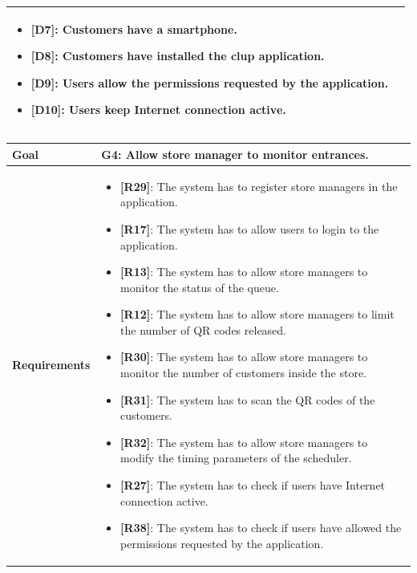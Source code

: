 \begin{table}[H]
\begin{tabular}{| m{} | m{} |}
        \begin{itemize}
            \item {\textbf{[D7]}}: Customers have a smartphone.
            \item {\textbf{[D8]}}: Customers have installed the \gls{clup} application.
            \item {\textbf{[D9]}}: Users allow the permissions requested by the application.
            \item {\textbf{[D10]}}: Users keep Internet connection active.
        \end{itemize} \\
        \hline
    \end{tabular}
\end{table}

\begin{table}[H]
    \centering
    \begin{tabular}{| m{} | m{} |}
        \hline
        \textbf{Goal} &
        \textbf{G4: Allow store manager to monitor entrances.} \\
        \hline
        \textbf{Requirements} &
        \begin{itemize}
            \item {\textbf{[R29]}}: The system has to register store managers in the application.
            \item {\textbf{[R17]}}: The system has to allow users to login to the application.
            \item {\textbf{[R13]}}: The system has to allow store managers to monitor the status of the queue.
            \item {\textbf{[R12]}}: The system has to allow store managers to limit the number of QR codes released.
            \item {\textbf{[R30]}}: The system has to allow store managers to monitor the number of customers inside the store.
            \item {\textbf{[R31]}}: The system has to scan the QR codes of the customers.
            \item {\textbf{[R32]}}: The system has to allow store managers to modify the timing parameters of the scheduler.
            \item {\textbf{[R27]}}: The system has to check if users have Internet connection active.
            \item {\textbf{[R38]}}: The system has to check if users have allowed the permissions requested by the application.
        \end{itemize} \\

\end{tabular}
\end{table}
